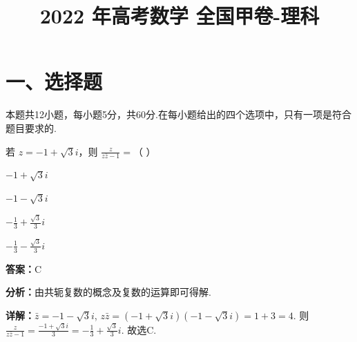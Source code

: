 ﻿\title{2022 年高考数学 全国甲卷-理科}
\date{}
\maketitle

\section*{一、选择题}
本题共12小题，每小题5分，共60分.在每小题给出的四个选项中，只有一项是符合题目要求的.

\begin{question}[points=5]
若 $z = -1 + \sqrt{3}i$，则 $\frac{z}{z\bar{z} - 1} = $（ ）
\begin{choices}
  \item $-1+\sqrt{3}i$
  \item $-1-\sqrt{3}i$
  \item $-\frac{1}{3}+\frac{\sqrt{3}}{3}i$
  \item $-\frac{1}{3}-\frac{\sqrt{3}}{3}i$
\end{choices}
\begin{solution}
\textbf{答案：}C

\textbf{分析：}由共轭复数的概念及复数的运算即可得解.

\textbf{详解：}$\bar{z} = -1 - \sqrt{3}i$, $z\bar{z} = (-1+\sqrt{3}i)(-1-\sqrt{3}i) = 1+3 = 4$. 则 $\frac{z}{z\bar{z}-1} = \frac{-1+\sqrt{3}i}{3} = -\frac{1}{3} + \frac{\sqrt{3}}{3}i$. 故选C.
\end{solution}
\end{question}

